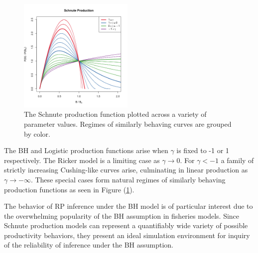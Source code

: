 %
\begin{figure}
\vspace{-0.6cm}
\includegraphics[width=0.49\textwidth]{../gpBias/g3.png}
\vspace{-1cm}
\caption{
The Schnute production function plotted across a variety of parameter
values. Regimes of similarly behaving curves are grouped by color.
}
\label{sRegimes}
\end{figure}

%
The BH and Logistic production functions arise when $\gamma$ is fixed to -1 or
1 respectively. The Ricker model is a limiting case as $\gamma\rightarrow0$. %
For $\gamma<-1$ a family of strictly increasing Cushing-like curves arise,
culminating in linear production as $\gamma\to-\infty$. These special cases form
natural regimes of similarly behaving production functions as seen in Figure (\ref{sRegimes}).

%
The behavior of RP inference under the BH model is of particular interest due
to the overwhelming popularity of the BH assumption in fisheries models.
Since Schnute production models can represent a quantifiably wide variety
of possible productivity behaviors, they present an ideal simulation
environment for inquiry of the reliability of inference under the BH
assumption.


